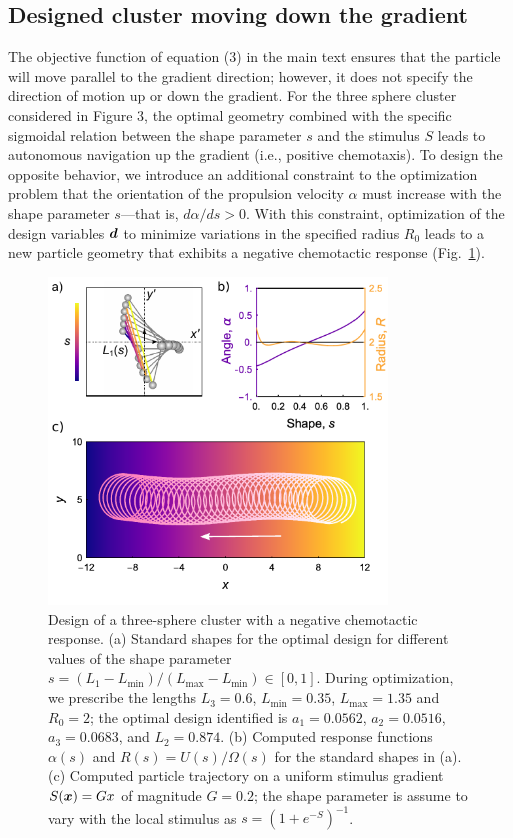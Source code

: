 \begin{appendices}
\section{Designed cluster moving down the gradient}

The objective function of equation (3) in the main text ensures that the particle will move parallel to the gradient direction; however, it does not specify the direction of motion up or down the gradient.  For the three sphere cluster considered in Figure 3, the optimal geometry combined with the specific sigmoidal relation between the shape parameter $s$ and the stimulus $S$ leads to autonomous navigation up the gradient (i.e., positive chemotaxis). To design the opposite behavior, we introduce an additional constraint to the optimization problem that the orientation of the propulsion velocity $\alpha$ must increase with the shape parameter $s$---that is, $d\alpha/ds>0$.  With this constraint, optimization of the design variables $\boldsymbol{d}$ to minimize variations in the specified radius $R_0$ leads to a new particle geometry that exhibits a negative chemotactic response (Fig.\ \ref{fig:negChemo}). 

\vspace{2cm}

\begin{figure}[h]
    \centering
    \includegraphics[width=9cm]{figures/A3_FigureS3.pdf}
    \caption{Design of a three-sphere cluster with a negative chemotactic response. (a) Standard shapes for the optimal design for different values of the shape parameter $s=(L_1-L_{\min})/(L_{\max}-L_{\min})\in [0,1]$. During optimization, we prescribe the lengths $L_3=0.6$, $L_{\min}=0.35$, $L_{\max}=1.35$ and $R_0=2$; the optimal design identified is $a_1=0.0562$, $a_2=0.0516$, $a_3=0.0683$, and $L_2=0.874$. (b) Computed response functions $\alpha(s)$ and $R(s)=U(s)/\Omega(s)$ for the standard shapes in (a). (c) Computed particle trajectory on a uniform stimulus gradient $S(\boldsymbol{x})=Gx$ of magnitude $G=0.2$; the shape parameter is assume to vary with the local stimulus as $s = (1+ e^{-S})^{-1}$.}
    \label{fig:negChemo}
\end{figure}


\end{appendices}
